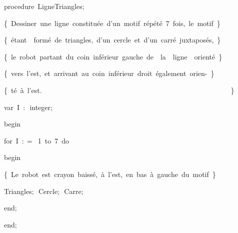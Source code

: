 {\pagebreak[3] 
\vspace{\neglskip}\mbox{\blc  \blk\idt  \mcl procedure\idt \ LigneTriangles$;$}\par 
\vspace{\neglskip}\mbox{\blc  \blk\idt  \cmt  \{\ Dessiner\ une\ ligne\ constitu\'{e}e\ d{'}un\ motif\ r\'{e}p\'{e}t\'{e}\ 7\ fois,\ le\ motif\ \}\idt }\par 
\vspace{\neglskip}\mbox{\blc  \blk\idt  \cmt  \{\ \'{e}tant\ \ form\'{e}\ de\ triangles,\ d{'}un\ cercle\ et\ d{'}un\ carr\'{e}\ juxtapos\'{e}s,\ \}\idt }\par 
\vspace{\neglskip}\mbox{\blc  \blk\idt  \cmt  \{\ le\ robot\ partant\ du\ coin\ inf\'{e}rieur\ gauche\ de\ \ la\ \ ligne\ \ orient\'{e}\ \}\idt }\par 
\vspace{\neglskip}\mbox{\blc  \blk\idt  \cmt  \{\ vers\ l{'}est,\ et\ arrivant\ au\ coin\ inf\'{e}rieur\ droit\ \'{e}galement\ orien-\ \}\idt }\par 
\vspace{\neglskip}\mbox{\blc  \blk\idt  \cmt  \{\ t\'{e}\ \`{a}\ l{'}est.\ \ \ \ \ \ \ \ \ \ \ \ \ \ \ \ \ \ \ \ \ \ \ \ \ \ \ \ \ \ \ \ \ \ \ \ \ \ \ \ \ \ \ \ \ \ \ \ \ \ \ \ \ \ \}\idt }\par 
\pagebreak[3] 
\vspace{\neglskip}\mbox{\blc  \blk\blk\idt  \mcl var\idt \ I\ $:$\ integer$;$}\par 
\vspace{\neglskip}\mbox{\blc  \blk\idt  \mcl begin\idt }\par 
\pagebreak[3] 
\vspace{\neglskip}\mbox{\blc  \blk\blk\idt  \mcl for\idt \ I\ $:$$=$\ 1\ \mcl to\idt \ 7\ \mcl do\idt }\par 
\vspace{\neglskip}\mbox{\blc  \blk\blk\blk\idt  \mcl begin\idt }\par 
\vspace{\neglskip}\mbox{\blc  \blk\blk\blk\blk\idt  \cmt  \{\ Le\ robot\ est\ crayon\ baiss\'{e},\ \`{a}\ l{'}est,\ en\ bas\ \`{a}\ gauche\ du\ motif\ \}\idt }\par 
\vspace{\neglskip}\mbox{\blc  \blk\blk\blk\blk\idt  Triangles$;$\ Cercle$;$\ Carre$;$\ }\par 
\vspace{\neglskip}\mbox{\blc  \blk\blk\blk\idt  \mcl end\idt $;$}\par 
\vspace{\neglskip}\mbox{\blc  \blk\idt  \mcl end\idt $;$}\par 
\medskip

}
